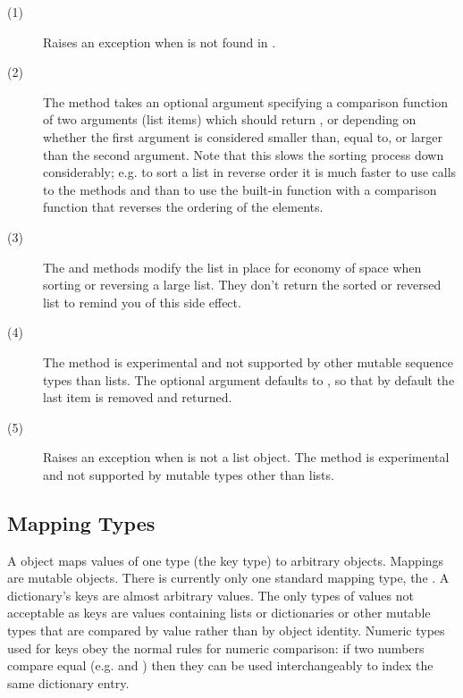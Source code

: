 \begin{description}
\item[(1)] Raises an exception when  is not found in .
  
\item[(2)] The  method takes an optional argument
  specifying a comparison function of two arguments (list items) which
  should return ,  or  depending on whether the
  first argument is considered smaller than, equal to, or larger than the
  second argument.  Note that this slows the sorting process down
  considerably; e.g. to sort a list in reverse order it is much faster
  to use calls to the methods  and 
  than to use the built-in function  with a
  comparison function that reverses the ordering of the elements.

\item[(3)] The  and  methods modify the
list in place for economy of space when sorting or reversing a large
list.  They don't return the sorted or reversed list to remind you of
this side effect.

\item[(4)] The  method is experimental and not supported 
by other mutable sequence types than lists.
The optional argument  defaults to , so that
by default the last item is removed and returned.

\item[(5)] Raises an exception when  is not a list object.  The 
 method is experimental and not supported by mutable types
other than lists.
\end{description}


\subsection{Mapping Types \label{typesmapping}}

A  object maps values of one type (the key type) to
arbitrary objects.  Mappings are mutable objects.  There is currently
only one standard mapping type, the .  A dictionary's keys are
almost arbitrary values.  The only types of values not acceptable as
keys are values containing lists or dictionaries or other mutable
types that are compared by value rather than by object identity.
Numeric types used for keys obey the normal rules for numeric
comparison: if two numbers compare equal (e.g.  and
) then they can be used interchangeably to index the same
dictionary entry.

